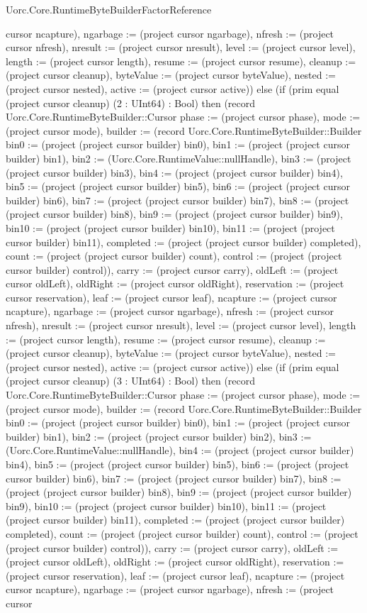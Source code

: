 \begin{lexlean}{Uorc.Core.RuntimeByteBuilderFactorReference}
\begin{semanticmodule}
{cursor ncapture), ngarbage := (project cursor ngarbage), nfresh := (project cursor nfresh), nresult := (project cursor nresult), level := (project cursor level), length := (project cursor length), resume := (project cursor resume), cleanup := (project cursor cleanup), byteValue := (project cursor byteValue), nested := (project cursor nested), active := (project cursor active)}) else (if (prim equal (project cursor cleanup) (2 : UInt64) : Bool) then (record Uorc.Core.RuntimeByteBuilder::Cursor {phase := (project cursor phase), mode := (project cursor mode), builder := (record Uorc.Core.RuntimeByteBuilder::Builder {bin0 := (project (project cursor builder) bin0), bin1 := (project (project cursor builder) bin1), bin2 := (Uorc.Core.RuntimeValue::nullHandle), bin3 := (project (project cursor builder) bin3), bin4 := (project (project cursor builder) bin4), bin5 := (project (project cursor builder) bin5), bin6 := (project (project cursor builder) bin6), bin7 := (project (project cursor builder) bin7), bin8 := (project (project cursor builder) bin8), bin9 := (project (project cursor builder) bin9), bin10 := (project (project cursor builder) bin10), bin11 := (project (project cursor builder) bin11), completed := (project (project cursor builder) completed), count := (project (project cursor builder) count), control := (project (project cursor builder) control)}), carry := (project cursor carry), oldLeft := (project cursor oldLeft), oldRight := (project cursor oldRight), reservation := (project cursor reservation), leaf := (project cursor leaf), ncapture := (project cursor ncapture), ngarbage := (project cursor ngarbage), nfresh := (project cursor nfresh), nresult := (project cursor nresult), level := (project cursor level), length := (project cursor length), resume := (project cursor resume), cleanup := (project cursor cleanup), byteValue := (project cursor byteValue), nested := (project cursor nested), active := (project cursor active)}) else (if (prim equal (project cursor cleanup) (3 : UInt64) : Bool) then (record Uorc.Core.RuntimeByteBuilder::Cursor {phase := (project cursor phase), mode := (project cursor mode), builder := (record Uorc.Core.RuntimeByteBuilder::Builder {bin0 := (project (project cursor builder) bin0), bin1 := (project (project cursor builder) bin1), bin2 := (project (project cursor builder) bin2), bin3 := (Uorc.Core.RuntimeValue::nullHandle), bin4 := (project (project cursor builder) bin4), bin5 := (project (project cursor builder) bin5), bin6 := (project (project cursor builder) bin6), bin7 := (project (project cursor builder) bin7), bin8 := (project (project cursor builder) bin8), bin9 := (project (project cursor builder) bin9), bin10 := (project (project cursor builder) bin10), bin11 := (project (project cursor builder) bin11), completed := (project (project cursor builder) completed), count := (project (project cursor builder) count), control := (project (project cursor builder) control)}), carry := (project cursor carry), oldLeft := (project cursor oldLeft), oldRight := (project cursor oldRight), reservation := (project cursor reservation), leaf := (project cursor leaf), ncapture := (project cursor ncapture), ngarbage := (project cursor ngarbage), nfresh := (project cursor }
\end{semanticmodule}
\end{lexlean}
